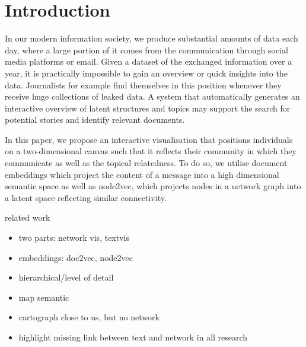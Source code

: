 \section{Introduction}


In our modern information society, we produce substantial amounts of data each day, where a large portion of it comes from the communication through social media platforms or email.
Given a dataset of the exchanged information over a year, it is practically impossible to gain an overview or quick insights into the data.
Journalists for example find themselves in this position whenever they receive huge collections of leaked data.
A system that automatically generates an interactive overview of latent structures and topics may support the search for potential stories and identify relevant documents.

In this paper, we propose an interactive visualisation that positions individuals on a two-dimensional canvas such that it reflects their community in which they communicate as well as the topical relatedness.
To do so, we utilise document embeddings which project the content of a message into a high dimensional semantic space as well as node2vec, which projects nodes in a network graph into a latent space reflecting similar connectivity.


\cite{chen2009exemplar}
\cite{dang2017cactustree}
\cite{efrat2015mapsets}
\cite{fortuna2005visualization}
\cite{fried2014maps}
\cite{gronemann2012drawing}
\cite{hildenbrand2016flexible}
\cite{pang2017creating}
\cite{sallaberry2016contact}
\cite{sen2017cartograph}
\cite{tao2017honvis}
\cite{wei2010tiara}
\cite{white2009exploratory}
\cite{yang2014overlapping}

related work
\begin{itemize}
	\item two parts: network vis, textvis
	\item embeddings: doc2vec, node2vec
	\item hierarchical/level of detail
	\item map semantic
	\item cartograph close to us, but no network
	\item highlight missing link between text and network in all research
\end{itemize}

